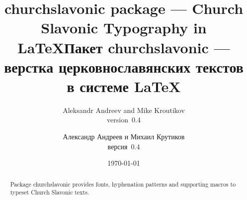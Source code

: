\usepackage{fontspec,metalogo}

\newfontfamily{}
\newfontfamily{}
\setmonofont[Scale=MatchLowercase]{FiraSlav}
\newfontfamily{}
\newfontfamily{}
\newfontfamily{}
\newfontfamily{}

\usepackage{churchslavonic}
\usepackage{doc}
\usepackage{lettrine}
\usepackage[unicode,
  pdftitle={churchslavonic: a package for typesetting Church Slavonic documents in TeX},
  pdfauthor={Aleksandr Andreev and Mike Kroutikov},
  pdfkeywords={Church Slavonic, Old Church Slavonic, Church Slavic, Znamenny Notation, LaTeX, TeX, XeTeX, LuaTeX, OpenType, Unicode, церковнославянский, старославянский, знаменная нотация, крюки, столповая нотация}
]{hyperref}

\def\fileversion{0.4}
\let\cuKrukFont=\musicFont
\def\pkg#1{\textsf{#1}}
\def\cs#1{\texttt{\textbackslash #1}}
%
%
\makeatletter
\def\cu@lettrine{\lettrine[lines=3,findent=0pt,nindent=0pt]}
\def\cuLettrine{\cu@tokenizeletter\cu@lettrine}
\renewcommand{\LettrineFontHook}{\cuKinovarColor}
\makeatother



\begin{EN}
\title{\pkg{churchslavonic} package --- Church Slavonic Typography in \LaTeX}
\author{Aleksandr Andreev and Mike Kroutikov\\version~\fileversion}
\end{EN}

\begin{RU}
\title{Пакет \pkg{churchslavonic} --- верстка церковнославянских текстов в системе \LaTeX}
\author{Александр Андреев и Михаил Крутиков\\версия~\fileversion}
\end{RU}

\date{\today}
\maketitle

\begin{EN}
\begin{abstract}
Package \pkg{churchslavonic} provides fonts, hyphenation patterns and supporting macros to typeset
Church Slavonic texts.
\end{abstract}
\end{EN}

